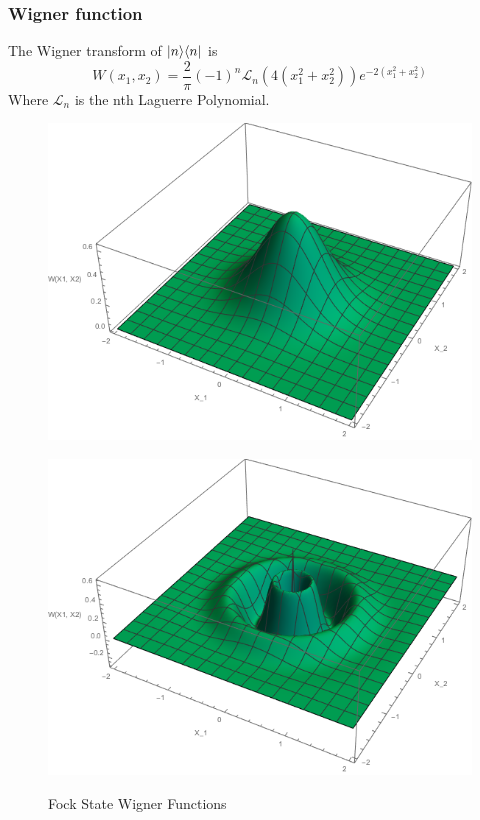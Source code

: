 \subsubsection{Wigner function}
The Wigner transform of $| n \rangle\langle n |$ is\autocite[65]{Walls2008}
\begin{equation}
	W(x_1, x_2) = \frac{2}{\pi} (-1)^n \mathscr{L}_n(4(x_1^2+x_2^2))e^{-2(x_1^2+x_2^2)}
\end{equation}
Where $\mathscr{L}_n$ is the nth Laguerre Polynomial.
\begin{figure}[H]
	\begin{minipage}[b]{.5\linewidth}
		\centering \large \includegraphics[width=1\textwidth]{Images/W Function-n=0.png} 
		\label{fig:n=0}
	\end{minipage}%
	\begin{minipage}[b]{.5\linewidth}
		\centering\large \includegraphics[width = 1\textwidth]{Images/W Function-n=10.png}
		\label{fig:n=10}
	\end{minipage}
	\caption{Fock State Wigner Functions}\label{Wfunctions}
\end{figure}


